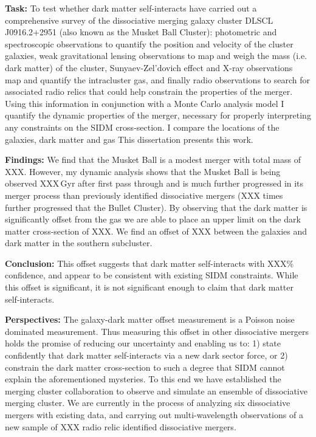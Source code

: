 \noindent\textbf{Task:} 
To test whether dark matter self-interacts  have carried out a comprehensive survey of the dissociative merging galaxy cluster DLSCL J0916.2+2951 (also known as the Musket Ball Cluster):
photometric and spectroscopic observations to quantify the position and velocity of the cluster galaxies,
weak gravitational lensing observations to map and weigh the mass (i.e. dark matter) of the cluster,
Sunyaev-Zel'dovich effect and X-ray observations map and quantify the intracluster gas,
and finally radio observations to search for associated radio relics that could help constrain the properties of the merger.
Using this information in conjunction with a Monte Carlo analysis model I quantify the dynamic properties of the merger, necessary for properly interpreting any constraints on the SIDM cross-section.
I compare the locations of the galaxies, dark matter and gas
This dissertation presents this work.

\noindent\textbf{Findings:} 
We find that the Musket Ball is a modest merger with total mass of XXX.
However, my dynamic analysis shows that the Musket Ball is being observed XXX\,Gyr after first pass through and is much further progressed in its merger process than previously identified dissociative mergers (XXX times further progressed that the Bullet Cluster). 
By observing that the dark matter is significantly offset from the gas we are able to place an upper limit on the dark matter cross-section of XXX.
We find an offset of XXX between the galaxies and dark matter in the southern subcluster.

\noindent\textbf{Conclusion:}
This offset suggests that dark matter self-interacts with XXX\% confidence, and appear to be consistent with existing SIDM constraints.
While this offset is significant, it is not significant enough to claim that dark matter self-interacts.

\noindent\textbf{Perspectives:}
The galaxy-dark matter offset measurement is a Poisson noise dominated measurement.
Thus measuring this offset in other dissociative mergers holds the promise of reducing our uncertainty and enabling us to: 1) state confidently that dark matter self-interacts via a new dark sector force, or 2) constrain the dark matter cross-section to such a degree that SIDM cannot explain the aforementioned mysteries.
To this end we have established the merging cluster collaboration to observe and simulate an ensemble of dissociative merging cluster.
We are currently in the process of analyzing six dissociative mergers with existing data, and carrying out multi-wavelength observations of a new sample of XXX radio relic identified dissociative mergers.